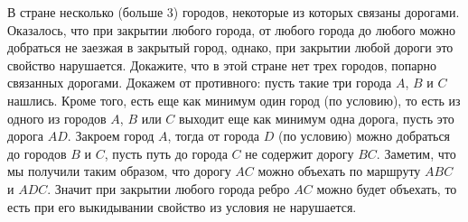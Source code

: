\problem
В стране несколько (больше 3) городов, некоторые из которых связаны дорогами.
Оказалось, что при закрытии любого города, от любого города до любого можно
добраться не заезжая в закрытый город, однако, при закрытии любой дороги это
свойство нарушается.
Докажите, что в этой стране нет трех городов, попарно связанных дорогами.
\solution
Докажем от противного: пусть такие три города $A$, $B$ и $C$ нашлись.
Кроме того, есть еще как минимум один город (по условию), то есть из одного из
городов $A$, $B$ или $C$ выходит еще как минимум одна дорога, пусть это дорога
$AD$.
Закроем город $A$, тогда от города $D$ (по условию) можно добраться до городов
$B$ и $C$, пусть путь до города $C$ не содержит дорогу $BC$.
Заметим, что мы получили таким образом, что дорогу $AC$ можно объехать по
маршруту $ABC$ и $ADC$.
Значит при закрытии любого города ребро $AC$ можно будет объехать, то есть при
его выкидывании свойство из условия не нарушается.
\endproblem
